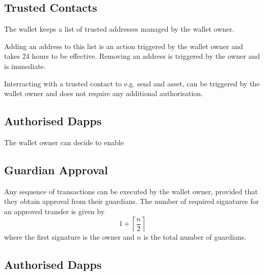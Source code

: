 \documentclass[12pt]{article}
\begin{document}
\subsection{Trusted Contacts}
\label{sec:trusted-contacts}

The wallet keeps a list of trusted addresses managed by the wallet owner.

Adding an address to this list is an action triggered by the wallet owner and takes 24 hours to be effective. Removing an address is triggered by the owner and is immediate.

Interracting with a trusted contact to e.g. send and asset, can be triggered by the wallet owner and does not require any additional authorisation. 

\subsection{Authorised Dapps}
\label{sec:authorised-dapps}

The wallet owner can decide to enable 

\subsection{Guardian Approval}
\label{sec:guardian-approval}

Any sequence of transactions can be executed by the wallet owner, provided that they obtain approval from their guardians. The number of required signatures for an approved transfer is given by
\begin{equation*}
    1+\left\lceil {\frac{n}{2}} \right\rceil
\end{equation*}
where the first signature is the owner and $n$ is the total number of guardians.


\subsection{Authorised Dapps}
\label{sec:authorised-dapps}


\end{document}
